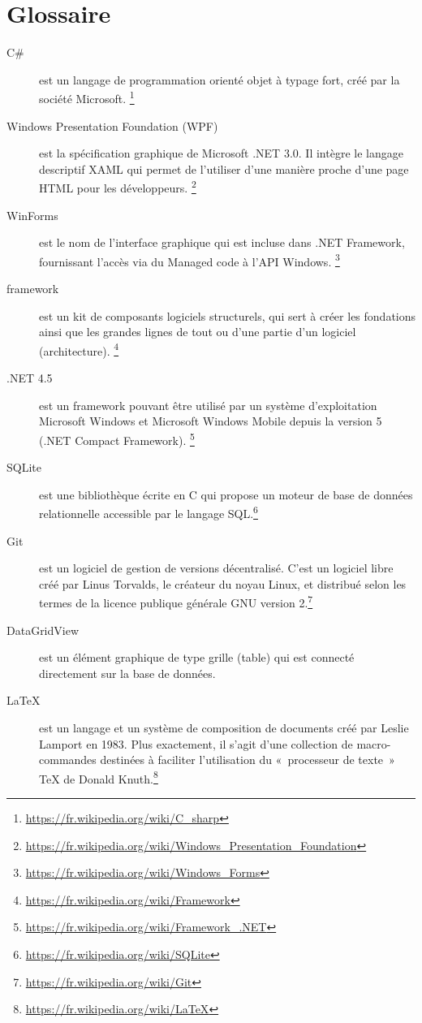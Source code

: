 \documentclass[letterpaper, oneside, 12pt, these, creativecommons]{thETS}
\begin{document}


\tableofcontents


\frontmatter

\chapter{Glossaire}

\begin{description}
\item[C\#] est un langage de programmation orienté objet à typage fort, créé par la société Microsoft. \footnote{\url{https://fr.wikipedia.org/wiki/C_sharp}}
\item[Windows Presentation Foundation (WPF)] est la spécification graphique de Microsoft .NET 3.0. Il intègre le langage descriptif XAML qui permet de l'utiliser d'une manière proche d'une page HTML pour les développeurs. \footnote{\url{https://fr.wikipedia.org/wiki/Windows_Presentation_Foundation}}
\item[WinForms] est le nom de l'interface graphique qui est incluse dans .NET Framework, fournissant l'accès via du Managed code à l'API Windows. \footnote{\url{https://fr.wikipedia.org/wiki/Windows_Forms}}
\item[framework] est un kit de composants logiciels structurels, qui sert à créer les fondations ainsi que les grandes lignes de tout ou d’une partie d'un logiciel (architecture). \footnote{\url{https://fr.wikipedia.org/wiki/Framework}}
\item[.NET 4.5] est un framework pouvant être utilisé par un système d'exploitation Microsoft Windows et Microsoft Windows Mobile depuis la version 5 (.NET Compact Framework). \footnote{\url{https://fr.wikipedia.org/wiki/Framework_.NET}}
\item[SQLite] est une bibliothèque écrite en C qui propose un moteur de base de données relationnelle accessible par le langage SQL.\footnote{\url{https://fr.wikipedia.org/wiki/SQLite}}
\item[Git] est un logiciel de gestion de versions décentralisé. C'est un logiciel libre créé par Linus Torvalds, le créateur du noyau Linux, et distribué selon les termes de la licence publique générale GNU version 2.\footnote{\url{https://fr.wikipedia.org/wiki/Git}}
\item[DataGridView] est un élément graphique de type grille (table) qui est connecté directement sur la base de données.
\item[\LaTeX] est un langage et un système de composition de documents créé par Leslie Lamport en 1983. Plus exactement, il s'agit d'une collection de macro-commandes destinées à faciliter l'utilisation du « processeur de texte » TeX de Donald Knuth.\footnote{\url{https://fr.wikipedia.org/wiki/LaTeX}}
\end{description}
\end{document}
